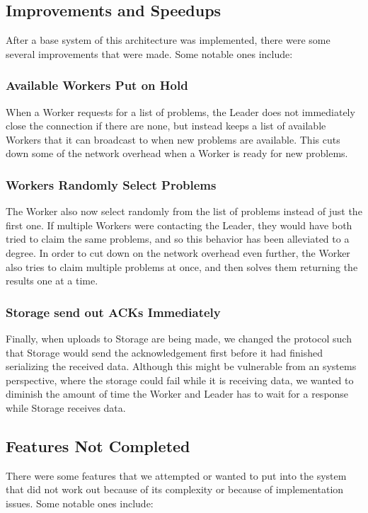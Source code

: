 \documentclass[12pt]{article}
\begin{document}
\subsection{Improvements and Speedups}
After a base system of this architecture was implemented, there were some several improvements that were made. Some notable ones include:

\subsubsection{Available Workers Put on Hold}
When a Worker requests for a list of problems, the Leader does not immediately close the connection if there are none, but instead keeps a list of available Workers that it can broadcast to when new problems are available. This cuts down some of the network overhead when a Worker is ready for new problems. 

\subsubsection{Workers Randomly Select Problems}
The Worker also now select randomly from the list of problems instead of just the first one. If multiple Workers were contacting the Leader, they would have both tried to claim the same problems, and so this behavior has been alleviated to a degree. In order to cut down on the network overhead even further, the Worker also tries to claim multiple problems at once, and then solves them returning the results one at a time.

\subsubsection{Storage send out ACKs Immediately}
Finally, when uploads to Storage are being made, we changed the protocol such that Storage would send the acknowledgement first before it had finished serializing the received data. Although this might be vulnerable from an systems perspective, where the storage could fail while it is receiving data, we wanted to diminish the amount of time the Worker and Leader has to wait for a response while Storage receives data.


\subsection{Features Not Completed}
There were some features that we attempted or wanted to put into the system that did not work out because of its complexity or because of implementation issues. Some notable ones include:
\end{document}

